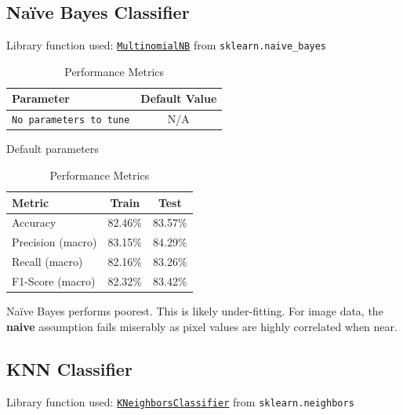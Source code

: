\subsection{Na\"{i}ve Bayes Classifier}
Library function used: \texttt{\href{https://scikit-learn.org/stable/modules/generated/sklearn.naive_bayes.MultinomialNB.html}{MultinomialNB}} from \texttt{sklearn.naive\_bayes}
\begin{table}[h!]
  \begin{minipage}{.5\linewidth}
    \centering
    \begin{tabular}{|l|c|}
      \hline
      \textbf{Parameter} & \textbf{Default Value} \\
      \hline
      \texttt{No parameters to tune} & N/A \\
      \hline
    \end{tabular}
    \caption{Default parameters}
  \end{minipage}%
  \begin{minipage}{.5\linewidth}
    \centering
    \begin{tabular}{|l|c|c|}
      \hline
      \textbf{Metric} & \textbf{Train} & \textbf{Test} \\
      \hline
      Accuracy & 82.46\% & 83.57\% \\
      Precision (macro) & 83.15\% & 84.29\% \\
      Recall (macro) & 82.16\% & 83.26\% \\
      F1-Score (macro) & 82.32\% & 83.42\% \\
      \hline
    \end{tabular}
    \caption{Performance Metrics}
  \end{minipage}
\end{table}

Na\"{i}ve Bayes performs poorest. This is likely under-fitting. For image data, the \textbf{naive} assumption fails miserably as pixel values are highly correlated when near. 

\subsection{KNN Classifier}
Library function used: \texttt{\href{https://scikit-learn.org/stable/modules/generated/sklearn.neighbors.KNeighborsClassifier.html}{KNeighborsClassifier}} from \texttt{sklearn.neighbors}

